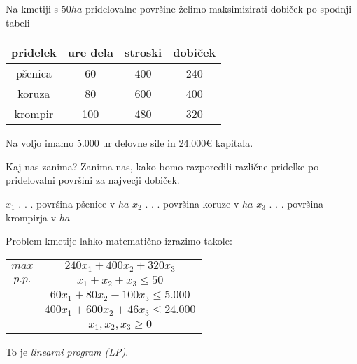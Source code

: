 \documentclass[11pt, a4paper]{article}
\begin{document}
        \begin{example}
            \par
            Na kmetiji s \(50 ha\) pridelovalne površine želimo maksimizirati dobiček po spodnji tabeli

            \begin{center}
                \begin{tabular}{ c|c|c|c }
                    pridelek & ure dela & stroski & dobiček \\
                    \hline
                    pšenica & 60 & 400 & 240 \\
                    koruza & 80 & 600 & 400 \\
                    krompir & 100 & 480 & 320 \\
                \end{tabular}
            \end{center}
            
            Na voljo imamo 5.000 ur delovne sile in 24.000€ kapitala.
            
            \par
            Kaj nas zanima? Zanima nas, kako bomo razporedili različne pridelke po pridelovalni površini za najvecji dobiček.

            \par
            \(x_1\) . . . površina pšenice v \(ha\)
            \newline
            \(x_2\) . . . površina koruze v \(ha\)
            \newline
            \(x_3\) . . . površina krompirja v \(ha\)
            \newline
            
            Problem kmetije lahko matematično izrazimo takole: \\

            \begin{center}
                \begin{tabular}{ cc }
                    $max$ & \(
                        240x_1+400x_2+320x_3
                    \) \\
                    $p.p.$ & \(
                        x_1+x_2+x_3 \le 50
                    \) \\
                    & \(
                        60x_1+80x_2+100x_3 \le 5.000
                    \) \\
                    & \(
                        400x_1+600x_2+46x_3 \le 24.000
                    \) \\
                    & \(
                        x_1,x_2,x_3 \ge 0    
                    \) \\
                \end{tabular}
            \end{center}

            To je \emph{linearni program (LP)}.
        \end{example}
\end{document}
